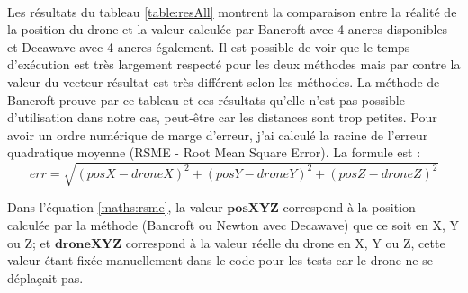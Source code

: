            \begin{table}[H]
                \caption{\label{table:resBancroft}Résultats obtenus avec Bancroft}
            \end{table}
            
            \paragraph*{}
            Les résultats du tableau \ref{table:resAll} montrent la comparaison entre la réalité de la position du drone et la valeur calculée par Bancroft avec 4 ancres disponibles et Decawave avec 4 ancres également. Il est possible de voir que le temps d'exécution est très largement respecté pour les deux méthodes mais par contre la valeur du vecteur résultat est très différent selon les méthodes. La méthode de Bancroft prouve par ce tableau et ces résultats qu'elle n'est pas possible d'utilisation dans notre cas, peut-être car les distances sont trop petites. Pour avoir un ordre numérique de marge d'erreur, j'ai calculé la racine de l'erreur quadratique moyenne (RSME - Root Mean Square Error). La formule est : 
            \begin{equation} \label{maths:rsme}
                err=\sqrt{(posX-droneX)^{2}+(posY-droneY)^{2}+(posZ-droneZ)^{2}}
            \end{equation}
            
            Dans l'équation \ref{maths:rsme}, la valeur $\mathbf{posXYZ}$ correspond à la position calculée par la méthode (Bancroft ou Newton avec Decawave) que ce soit en X, Y ou Z; et $\mathbf{droneXYZ}$ correspond à la valeur réelle du drone en X, Y ou Z, cette valeur étant fixée manuellement dans le code pour les tests car le drone ne se déplaçait pas.
            
